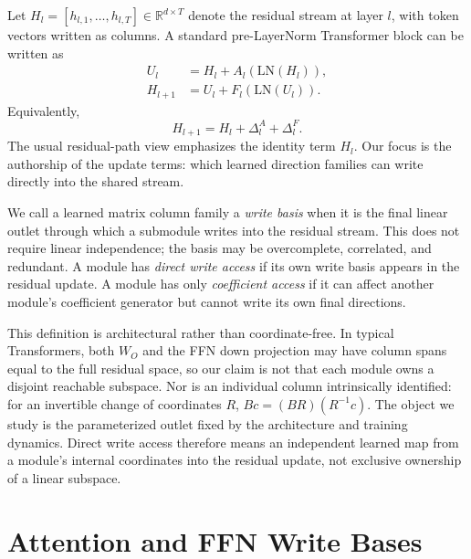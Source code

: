 \documentclass[letterpaper]{article}
\newcommand{\R}{\mathbb{R}}
\newcommand{\LN}{\mathrm{LN}}
\begin{document}
Let $H_l=[h_{l,1},\ldots,h_{l,T}]\in\R^{d\times T}$ denote the residual stream
at layer $l$, with token vectors written as columns. A standard pre-LayerNorm
Transformer block can be written as
\begin{align}
U_l &= H_l + A_l(\LN(H_l)),\\
H_{l+1} &= U_l + F_l(\LN(U_l)).
\end{align}
Equivalently,
\begin{equation}
H_{l+1}=H_l+\Delta_l^A+\Delta_l^F.
\end{equation}
The usual residual-path view emphasizes the identity term $H_l$. Our focus is
the authorship of the update terms: which learned direction families can write
directly into the shared stream.

We call a learned matrix column family a \emph{write basis} when it is the final
linear outlet through which a submodule writes into the residual stream. This
does not require linear independence; the basis may be overcomplete,
correlated, and redundant. A module has \emph{direct write access} if its own
write basis appears in the residual update. A module has only
\emph{coefficient access} if it can affect another module's coefficient
generator but cannot write its own final directions.

This definition is architectural rather than coordinate-free. In typical
Transformers, both $W_O$ and the FFN down projection may have column spans equal
to the full residual space, so our claim is not that each module owns a
disjoint reachable subspace. Nor is an individual column intrinsically
identified: for an invertible change of coordinates $R$, $Bc=(BR)(R^{-1}c)$.
The object we study is the parameterized outlet fixed by the architecture and
training dynamics. Direct write access therefore means an independent learned
map from a module's internal coordinates into the residual update, not exclusive
ownership of a linear subspace.

\section{Attention and FFN Write Bases}
\end{document}

